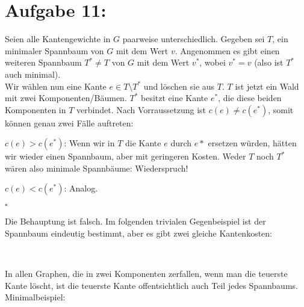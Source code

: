 \documentclass[11pt]{scrartcl} %
\begin{document}
\section*{Aufgabe 11:}
\begin{compactenum}[(a)]
    \item Seien alle Kantengewichte in $G$ paarweise unterschiedlich. Gegeben sei $T$, ein minimaler Spannbaum von $G$ mit dem Wert $v$. Angenommen es gibt einen weiteren Spannbaum $T^* \ne T$ von $G$ mit dem Wert $v^*$, wobei $v^* = v$ (also ist $T^*$ auch minimal).\\
    Wir wählen nun eine Kante $e \in T \setminus T^*$ und löschen sie aus $T$. $T$ ist jetzt ein Wald mit zwei Komponenten/Bäumen. $T^*$ besitzt eine Kante $e^*$, die diese beiden Komponenten in $T$ verbindet. Nach Vorraussetzung ist $c(e) \ne c(e^*)$, somit können genau zwei Fälle auftreten:\\

    \begin{compactenum}[1.]
        \item $c(e) > c(e^*)$: Wenn wir in $T$ die Kante $e$ durch $e*$ ersetzen würden, hätten wir wieder einen Spannbaum, aber mit geringeren Kosten. Weder $T$ noch $T^*$ wären also minimale Spannbäume: Wiederspruch!
        \item $c(e) < c(e^*)$: Analog.
    \end{compactenum}
    \hfill $\square$\\

    \item Die Behauptung ist falsch. Im folgenden trivialen Gegenbeispiel ist der Spannbaum eindeutig bestimmt, aber es gibt zwei gleiche Kantenkosten:\\
    \begin{center}
    \\[0.5cm]
    \end{center}

    \item In allen Graphen, die in zwei Komponenten zerfallen, wenn man die teuerste Kante löscht, ist die teuerste Kante offentsichtlich auch Teil jedes Spannbaums. Minimalbeispiel:\\
    \begin{center}
    \end{center}

\end{compactenum}
\end{document}
